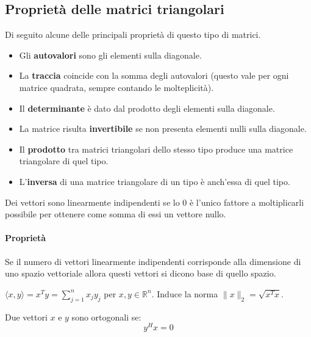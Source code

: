 \documentclass[12pt,a4paper,]{report}
\begin{document}
\subsection{Proprietà delle matrici triangolari}
Di seguito alcune delle principali proprietà di questo tipo di matrici.
\begin{itemize}
    \item Gli \textbf{autovalori} sono gli elementi sulla diagonale.
    \item La \textbf{traccia} coincide con la somma degli autovalori (questo vale per ogni matrice quadrata, sempre contando le molteplicità).
    \item Il \textbf{determinante} è dato dal prodotto degli elementi sulla diagonale.
    \item La matrice risulta \textbf{invertibile} se non presenta elementi nulli sulla diagonale.
    \item Il \textbf{prodotto} tra matrici triangolari dello stesso tipo produce una matrice triangolare di quel tipo.
    \item L'\textbf{inversa} di una matrice triangolare di un tipo è anch'essa di quel tipo.
\end{itemize}


\begin{lezione}
    [Lezione 4 08/03]
\end{lezione}

\begin{definizione}
    Dei vettori sono linearmente indipendenti se lo $0$ è l'unico fattore a moltiplicarli possibile per ottenere come somma di essi un vettore nullo.
\end{definizione}
\paragraph{Proprietà}
Se il numero di vettori linearmente indipendenti corrisponde alla dimensione di uno spazio vettoriale allora questi vettori si dicono base di quello spazio.

\begin{definizione}
    $\langle x, y \rangle = x^T y = \sum_{j=1}^n x_j y_j$ per $x,y \in \mathbb{R}^n$. Induce la norma $\|x\|_2 = \sqrt{x^Tx}$.
\end{definizione}

\begin{definizione}
    Due vettori $x$ e $y$ sono ortogonali se:
    \[
    y^Hx=0
    \]
\end{definizione}
\end{document}
